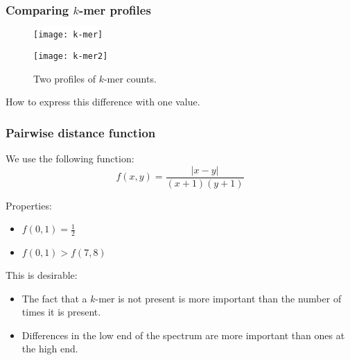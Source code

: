 \documentclass[slidestop]{beamer}
\begin{document}
\begin{frame}
  \frametitle{Comparing $k$-mer profiles}

  \vspace{-0.5cm}
  \begin{figure}
    \colorbox{white}{
      \texttt{[image: k-mer]}
    }
    \smallskip

    \colorbox{white}{
      \texttt{[image: k-mer2]}
    }
    \vspace{-0.5cm}
    \caption{Two profiles of $k$-mer counts.}
  \end{figure}
  \pause

  How to express this difference with one value.
\end{frame}

\begin{frame}
  \frametitle{Pairwise distance function}

  We use the following function:
  \begin{displaymath}
    f(x, y) = \frac{|x - y|}{(x + 1) (y + 1)}
  \end{displaymath}
  \pause

  Properties:
  \begin{itemize}
    \item $f(0, 1) = \frac12$
    \item $f(0, 1) > f(7, 8)$
  \end{itemize}
  \bigskip
  \bigskip
  \pause

  This is desirable:
  \begin{itemize}
    \item The fact that a $k$-mer is not present is more important than the
      number of times it is present.
    \item Differences in the low end of the spectrum are more important than
      ones at the high end.
  \end{itemize}
\end{frame}
\end{document}
